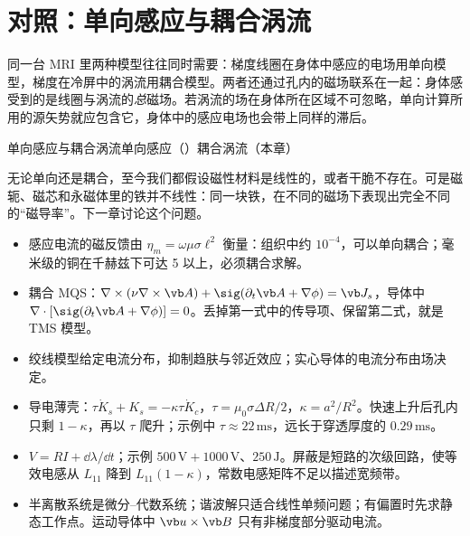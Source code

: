 \section{对照：单向感应与耦合涡流}\label{sec:eddy-compare}

同一台 MRI 里两种模型往往同时需要：梯度线圈在身体中感应的电场用单向模型，梯度在冷屏中的涡流用耦合模型。两者还通过孔内的磁场联系在一起：身体感受到的是线圈与涡流的\emph{总}磁场。若涡流的场在身体所在区域不可忽略，单向计算所用的源矢势就应包含它，身体中的感应电场也会带上同样的滞后。

\begin{compare}{单向感应与耦合涡流}{单向感应（）}{耦合涡流（本章）}
\end{compare}

无论单向还是耦合，至今我们都假设磁性材料是线性的，或者干脆不存在。可是磁轭、磁芯和永磁体里的铁并不线性：同一块铁，在不同的磁场下表现出完全不同的“磁导率”。下一章讨论这个问题。

\begin{takeaways}
\begin{itemize}
\item 感应电流的磁反馈由 $\eta_m=\omega\mu\sigma\ell^2$ 衡量：组织中约 $10^{-4}$，可以单向耦合；毫米级的铜在千赫兹下可达 5 以上，必须耦合求解。
\item 耦合 MQS：$\nabla\times(\nu\nabla\times\vb A)+\sig(\partial_t\vb A+\nabla\phi)=\vb J_s$，导体中 $\nabla\cdot[\sig(\partial_t\vb A+\nabla\phi)]=0$。丢掉第一式中的传导项、保留第二式，就是 TMS 模型。
\item 绞线模型给定电流分布，抑制趋肤与邻近效应；实心导体的电流分布由场决定。
\item 导电薄壳：$\tau\dot K_s+K_s=-\kappa\tau\dot K_c$，$\tau=\mu_0\sigma\Delta R/2$，$\kappa=a^2/R^2$。快速上升后孔内只剩 $1-\kappa$，再以 $\tau$ 爬升；示例中 $\tau\approx22\,\mathrm{ms}$，远长于穿透厚度的 $0.29\,\mathrm{ms}$。
\item $V=RI+\dd\lambda/\dd t$；示例 $500\,\mathrm V+1000\,\mathrm V$、$250\,\mathrm J$。屏蔽是短路的次级回路，使等效电感从 $L_{11}$ 降到 $L_{11}(1-\kappa)$，常数电感矩阵不足以描述宽频带。
\item 半离散系统是微分--代数系统；谐波解只适合线性单频问题；有偏置时先求静态工作点。运动导体中 $\vb u\times\vb B$ 只有非梯度部分驱动电流。
\end{itemize}
\end{takeaways}

